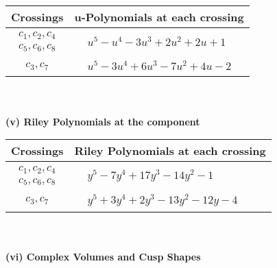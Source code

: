 \documentclass[1p]{elsarticle_modified}
\theoremstyle{definition}
\begin{document}
\begin{tabular}{m{50pt}|m{274pt}}
Crossings & \hspace{64pt}u-Polynomials at each crossing \\
\hline $$\begin{aligned}c_{1},c_{2},c_{4}\\c_{5},c_{6},c_{8}\end{aligned}$$&$\begin{aligned}
&u^5- u^4-3 u^3+2 u^2+2 u+1
\end{aligned}$\\
\hline $$\begin{aligned}c_{3},c_{7}\end{aligned}$$&$\begin{aligned}
&u^5-3 u^4+6 u^3-7 u^2+4 u-2
\end{aligned}$\\
\hline
\end{tabular}\\~\\
\newpage\renewcommand{\arraystretch}{1}
\flushleft \textbf{(v) Riley Polynomials at the component}\newline \\
\begin{tabular}{m{50pt}|m{274pt}}
Crossings & \hspace{64pt}Riley Polynomials at each crossing \\
\hline $$\begin{aligned}c_{1},c_{2},c_{4}\\c_{5},c_{6},c_{8}\end{aligned}$$&$\begin{aligned}
&y^5-7 y^4+17 y^3-14 y^2-1
\end{aligned}$\\
\hline $$\begin{aligned}c_{3},c_{7}\end{aligned}$$&$\begin{aligned}
&y^5+3 y^4+2 y^3-13 y^2-12 y-4
\end{aligned}$\\
\hline
\end{tabular}\\~\\
\newpage\flushleft \textbf{(vi) Complex Volumes and Cusp Shapes}
\end{document}
